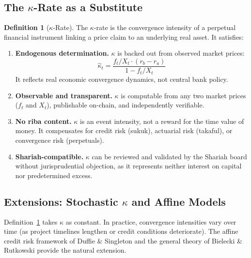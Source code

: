 \documentclass[10pt,twocolumn]{article}
\theoremstyle{plain}
\theoremstyle{definition}
\newtheorem{definition}{Definition}
\begin{document}
\subsection{The $\kappa$-Rate as a Substitute}

\begin{definition}[$\kappa$-Rate]
\label{def:kappa_rate}
The $\kappa$-rate is the convergence intensity of a perpetual
financial instrument linking a price claim to an underlying
real asset. It satisfies:
\begin{enumerate}[leftmargin=*,noitemsep]
\item \textbf{Endogenous determination.} $\kappa$ is backed out
from observed market prices:
\begin{equation}
\hat\kappa_t = \frac{f_t/X_t \cdot (r_b-r_a)}{1-f_t/X_t}
\label{eq:kappa_backout}
\end{equation}
It reflects real economic convergence dynamics, not central
bank policy.
\item \textbf{Observable and transparent.} $\kappa$ is computable
from any two market prices ($f_t$ and $X_t$), publishable
on-chain, and independently verifiable.
\item \textbf{No riba content.} $\kappa$ is an event intensity,
not a reward for the time value of money. It compensates for
credit risk (sukuk), actuarial risk (takaful), or convergence
risk (perpetuals).
\item \textbf{Shariah-compatible.} $\kappa$ can be reviewed
and validated by the Shariah board without jurisprudential
objection, as it represents neither interest on capital nor
predetermined excess.
\end{enumerate}
\end{definition}

\subsection{Extensions: Stochastic $\kappa$ and Affine Models}
\label{sec:stochastic_kappa}

Definition~\ref{def:kappa_rate} takes $\kappa$ as constant. In
practice, convergence intensities vary over time (as project timelines
lengthen or credit conditions deteriorate). The affine credit risk
framework of Duffie \& Singleton \cite{DuffieSingleton1999,DuffieSingleton2003}
and the general theory of Bielecki \& Rutkowski
\cite{BieleckiRutkowski2002} provide the natural extension.
\end{document}
